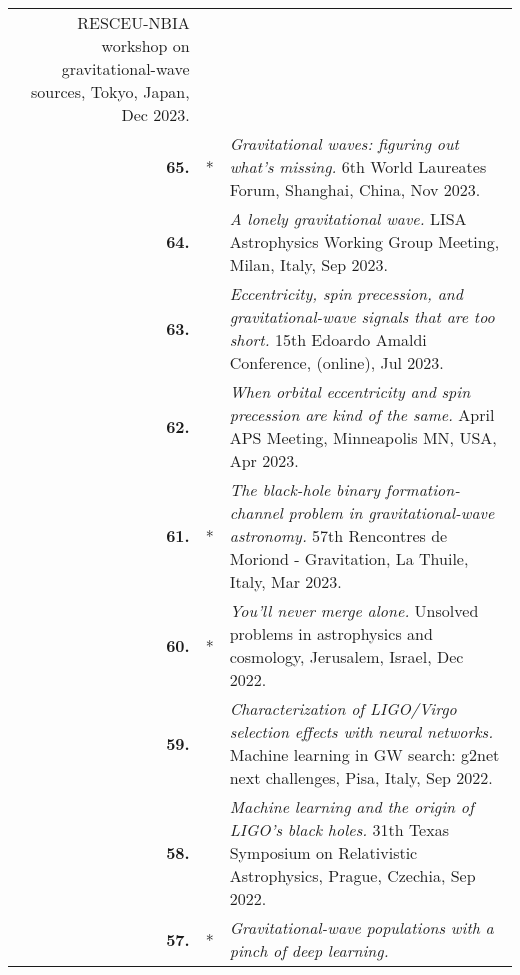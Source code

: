 {\begin{longtable}{rp{0.3cm}p{15.8cm}}
RESCEU-NBIA workshop on gravitational-wave sources, Tokyo, Japan, Dec 2023.
\vspace{0.05cm}\\
%
\textbf{65.} & * & \textit{Gravitational waves: figuring out what’s missing.}
\newline{}
6th World Laureates Forum, Shanghai, China, Nov 2023.
\vspace{0.05cm}\\
%
\textbf{64.} &  & \textit{A lonely gravitational wave.}
\newline{}
LISA Astrophysics Working Group Meeting, Milan, Italy, Sep 2023.
\vspace{0.05cm}\\
%
\textbf{63.} &  & \textit{Eccentricity, spin precession, and gravitational-wave signals that are too short.}
\newline{}
15th Edoardo Amaldi Conference, (online), Jul 2023.
\vspace{0.05cm}\\
%
\textbf{62.} &  & \textit{When orbital eccentricity and spin precession are kind of the same.}
\newline{}
April APS Meeting, Minneapolis MN, USA, Apr 2023.
\vspace{0.05cm}\\
%
\textbf{61.} & * & \textit{The black-hole binary formation-channel problem in gravitational-wave astronomy.}
\newline{}
57th Rencontres de Moriond - Gravitation, La Thuile, Italy, Mar 2023.
\vspace{0.05cm}\\
%
\textbf{60.} & * & \textit{You’ll never merge alone.}
\newline{}
Unsolved problems in astrophysics and cosmology, Jerusalem, Israel, Dec 2022.
\vspace{0.05cm}\\
%
\textbf{59.} &  & \textit{Characterization of LIGO/Virgo selection effects with neural networks.}
\newline{}
Machine learning in GW search: g2net next challenges, Pisa, Italy, Sep 2022.
\vspace{0.05cm}\\
%
\textbf{58.} &  & \textit{Machine learning and the origin of LIGO's black holes.}
\newline{}
31th Texas Symposium on Relativistic Astrophysics, Prague, Czechia, Sep 2022.
\vspace{0.05cm}\\
%
\textbf{57.} & * & \textit{Gravitational-wave populations with a pinch of deep learning.}

\end{longtable}}
